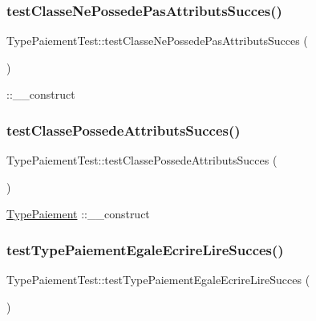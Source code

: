 \subsubsection{\texorpdfstring{test\+Classe\+Ne\+Possede\+Pas\+Attributs\+Succes()}{testClasseNePossedePasAttributsSucces()}}
{\footnotesize\ttfamily Type\+Paiement\+Test\+::test\+Classe\+Ne\+Possede\+Pas\+Attributs\+Succes (\begin{DoxyParamCaption}{ }\end{DoxyParamCaption})}

\+::\+\_\+\+\_\+construct \mbox{\label{class_type_paiement_test_ac963a46f2366b04ff8e5740f024969a5}} 
\subsubsection{\texorpdfstring{test\+Classe\+Possede\+Attributs\+Succes()}{testClassePossedeAttributsSucces()}}
{\footnotesize\ttfamily Type\+Paiement\+Test\+::test\+Classe\+Possede\+Attributs\+Succes (\begin{DoxyParamCaption}{ }\end{DoxyParamCaption})}

\hyperlink{class_type_paiement}{Type\+Paiement}  ::\+\_\+\+\_\+construct \mbox{\label{class_type_paiement_test_a00878b71b67fa7c3ba02fa5449986dbe}} 
\subsubsection{\texorpdfstring{test\+Type\+Paiement\+Egale\+Ecrire\+Lire\+Succes()}{testTypePaiementEgaleEcrireLireSucces()}}
{\footnotesize\ttfamily Type\+Paiement\+Test\+::test\+Type\+Paiement\+Egale\+Ecrire\+Lire\+Succes (\begin{DoxyParamCaption}{ }\end{DoxyParamCaption})}

